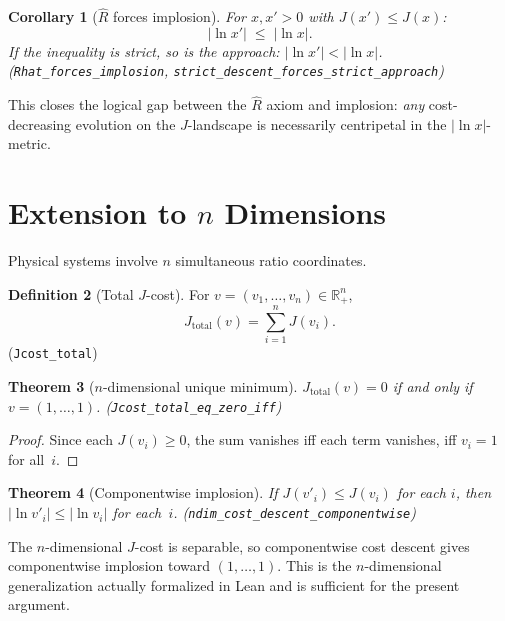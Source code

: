 \documentclass[11pt,a4paper]{article}
\newtheorem{theorem}{Theorem}[section]
\newtheorem{corollary}[theorem]{Corollary}
\theoremstyle{definition}
\newtheorem{definition}[theorem]{Definition}
\newcommand{\Jc}{J}
\newcommand{\Rhat}{\hat{R}}
\newcommand{\code}[1]{\texttt{\small #1}}
\begin{document}
\begin{corollary}[$\Rhat$ forces implosion]\label{cor:Rhat}
For $x, x' > 0$ with $\Jc(x') \le \Jc(x)$:
\[
  |\ln x'| \;\le\; |\ln x|.
\]
If the inequality is strict, so is the approach: $|\ln x'| < |\ln x|$.
\textup{(\code{Rhat\_forces\_implosion}, \code{strict\_descent\_forces\_strict\_approach})}
\end{corollary}

This closes the logical gap between the $\Rhat$ axiom and implosion:
\emph{any} cost-decreasing evolution on the $\Jc$-landscape is necessarily
centripetal in the $|\ln x|$-metric.

\section{Extension to \texorpdfstring{$n$}{n} Dimensions}
\label{sec:ndim}

Physical systems involve $n$ simultaneous ratio coordinates.

\begin{definition}[Total $\Jc$-cost]
For $v = (v_1, \ldots, v_n) \in \mathbb{R}_+^n$,
\[
  \Jc_{\mathrm{total}}(v) = \sum_{i=1}^n \Jc(v_i).
\]
\textup{(\code{Jcost\_total})}
\end{definition}

\begin{theorem}[$n$-dimensional unique minimum]\label{thm:ndim}
$\Jc_{\mathrm{total}}(v) = 0$ if and only if $v = (1, \ldots, 1)$.
\textup{(\code{Jcost\_total\_eq\_zero\_iff})}
\end{theorem}

\begin{proof}
Since each $\Jc(v_i) \ge 0$, the sum vanishes iff each term vanishes,
iff $v_i = 1$ for all~$i$.
\end{proof}

\begin{theorem}[Componentwise implosion]\label{thm:ndim-comp}
If $\Jc(v'_i) \le \Jc(v_i)$ for each $i$, then
$|\ln v'_i| \le |\ln v_i|$ for each~$i$.
\textup{(\code{ndim\_cost\_descent\_componentwise})}
\end{theorem}

The $n$-dimensional $\Jc$-cost is separable, so componentwise cost descent
gives componentwise implosion toward $(1,\ldots,1)$.  This is the
$n$-dimensional generalization actually formalized in Lean and is sufficient
for the present argument.
\end{document}
